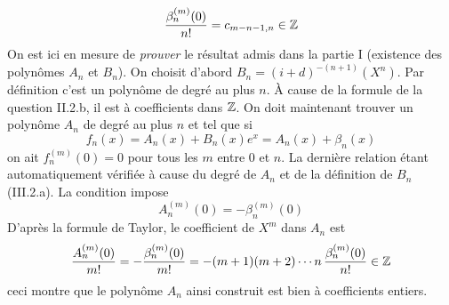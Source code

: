 \begin{enumerate}
\begin{enumerate}
\begin{displaymath}
 \dfrac{\beta_n^{(m)}(0)}{n!} = c_{m-n-1,n} \in \mathbb{Z}
\end{displaymath}
On est ici en mesure de \emph{prouver} le résultat admis dans la partie I (existence des polynômes $A_n$ et $B_n$).\newline
On choisit d'abord $B_n=(i+d)^{-(n+1)}(X^n)$. Par définition c'est un polynôme de degré au plus $n$. \`A  cause de la formule de la question II.2.b, il est à coefficients dans $\mathbb{Z}$.\newline
On doit maintenant trouver un polynôme $A_n$ de degré au plus $n$ et tel que si 
\begin{displaymath}
 f_n(x)=A_n(x)+B_n(x)e^x=A_n(x)+\beta_n(x)
\end{displaymath}
 on ait $f_n^{(m)}(0)=0$ pour tous les $m$ entre $0$ et $n$. La dernière relation étant automatiquement vérifiée à cause du degré de $A_n$ et de la définition de $B_n$ (III.2.a).\newline
La condition impose
\begin{displaymath}
 A_n^{(m)}(0)=-\beta_n^{(m)}(0)
\end{displaymath}
D'après la formule de Taylor, le coefficient de $X^m$ dans $A_n$ est
\begin{displaymath}
 \dfrac{A_n^{(m)}(0)}{m!}= - \dfrac{\beta_n^{(m)}(0)}{m!}= - (m+1)(m+2)\cdots n\,\dfrac{\beta_n^{(m)}(0)}{n!} \in \mathbb{Z}
\end{displaymath}
ceci montre que le polynôme $A_n$ ainsi construit est bien à coefficients entiers.

\end{enumerate}
\end{enumerate}
